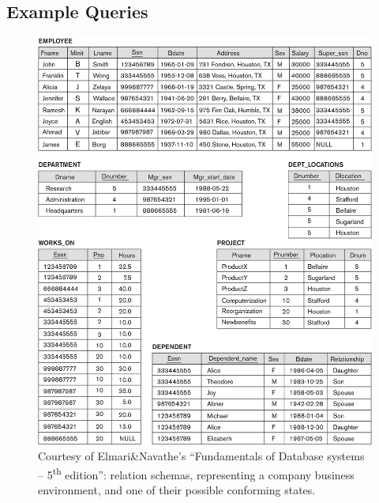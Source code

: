 \documentclass [a4paper, 12pt, twocolumn]{article}
\newcommand{\<}    {\langle}            %
\renewcommand{\>}  {\rangle}            %
\begin{document}
\subsection{Example Queries}

\begin{figure}
  \includegraphics[width=\textwidth]{schema.png}
  \caption{Courtesy of Elmari\&Navathe's ``Fundamentals of Database systems
    -- 5\textsuperscript{th} edition'': relation schemas, representing a
    company business environment, and one of their possible conforming
    states.}
  \label{fig:schema}
\end{figure}

\makeatletter
\newcommand{\rmnum}[1]{\romannumeral #1}
\newcommand{\Rmnum}[1]{\expandafter\@slowromancap\romannumeral #1@}
\makeatother

\newcommand{\Query}{\stepcounter{qcounter}(\theqcounter) }
\newcommand{\Queryd}{\stepcounter{qcounter}(\theqcounter$\ddagger$) }
\end{document}
